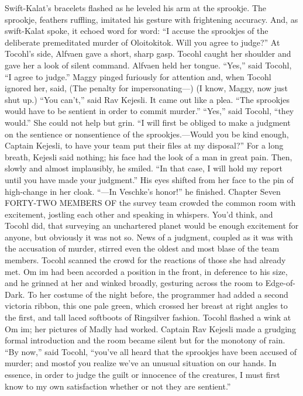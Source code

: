 \documentclass[9pt]{article}
\begin{document}
Swift-Kalat’s bracelets flashed as he leveled his arm at the sprookje. The sprookje, feathers ruffling,
imitated his gesture with frightening accuracy. And, as swift-Kalat spoke, it echoed word for word: “I
accuse the sprookjes of the deliberate premeditated murder of Oloitokitok. Will you agree to judge?”
At Tocohl’s side, Alfvaen gave a short, sharp gasp. Tocohl caught her shoulder and gave her a look
of silent command. Alfvaen held her tongue.
“Yes,” said Tocohl, “I agree to judge.”
Maggy pinged furiously for attention and, when Tocohl ignored her, said, (The penalty for
impersonating—)
(I know, Maggy, now just shut up.)
“You can’t,” said Rav Kejesli. It came out like a plea. “The sprookjes would have to be sentient in
order to commit murder.”
“Yes,” said Tocohl, “they would.” She could not help but grin. “I will first be obliged to make a
judgment on the sentience or nonsentience of the sprookjes.—Would you be kind enough, Captain
Kejesli, to have your team put their files at my disposal?”
For a long breath, Kejesli said nothing; his face had the look of a man in great pain. Then, slowly and
almost implausibly, he smiled.
“In that case, I will hold my report until you have made your judgment.” His eyes shifted from her
face to the pin of high-change in her cloak. “—In Veschke’s honor!” he finished.
Chapter Seven
FORTY-TWO MEMBERS OF the survey team crowded the common room with excitement,
jostling each other and speaking in whispers. You’d think, and Tocohl did, that surveying an unchartered
planet would be enough excitement for anyone, but obviously it was not so. News of a judgment,
coupled as it was with the accusation of murder, stirred even the oldest and most blase of the team
members.
Tocohl scanned the crowd for the reactions of those she had already met. Om im had been accorded
a position in the front, in deference to his size, and he grinned at her and winked broadly, gesturing across
the room to Edge-of-Dark. To her costume of the night before, the programmer had added a second
victoria ribbon, this one pale green, which crossed her breast at right angles to the first, and tall laced
softboots of Ringsilver fashion. Tocohl flashed a wink at Om im; her pictures of Madly had worked.
Captain Rav Kejesli made a grudging formal introduction and the room became silent but for the
monotony of rain.
“By now,” said Tocohl, “you’ve all heard that the sprookjes have been accused of murder; and mostof you realize we’ve an unusual situation on our hands. In essence, in order to judge the guilt or
innocence of the creatures, I must first know to my own satisfaction whether or not they are sentient.”
\end{document}
